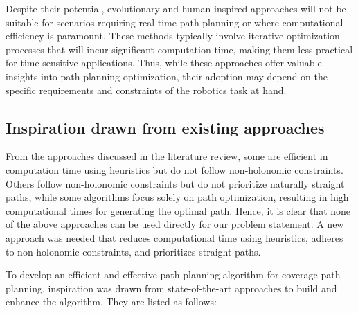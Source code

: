 \vspace{3mm}


Despite their potential, evolutionary and human-inspired approaches will not be suitable for scenarios requiring real-time path planning or where computational efficiency is paramount. These methods typically involve iterative optimization processes that will incur significant computation time, making them less practical for time-sensitive applications. Thus, while these approaches offer valuable insights into path planning optimization, their adoption may depend on the specific requirements and constraints of the robotics task at hand.


\subsection{Inspiration drawn from existing approaches}

From the approaches discussed in the literature review, some are efficient in computation time using heuristics but do not follow non-holonomic constraints. Others follow non-holonomic constraints but do not prioritize naturally straight paths, while some algorithms focus solely on path optimization, resulting in high computational times for generating the optimal path. Hence, it is clear that none of the above approaches can be used directly for our problem statement. A new approach was needed that reduces computational time using heuristics, adheres to non-holonomic constraints, and prioritizes straight paths.

\vspace{3mm}

To develop an efficient and effective path planning algorithm for coverage path planning, inspiration was drawn from state-of-the-art approaches to build and enhance the algorithm. They are listed as follows:

